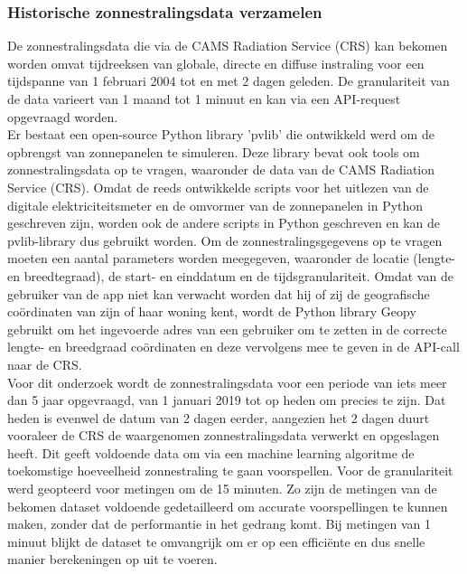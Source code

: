 \subsubsection{Historische zonnestralingsdata verzamelen}

De zonnestralingsdata die via de CAMS Radiation Service (CRS) kan bekomen worden omvat tijdreeksen van globale, directe en diffuse instraling voor een tijdspanne van 1 februari 2004 tot en met 2 dagen geleden. De granulariteit van de data varieert van 1 maand tot 1 minuut en kan via een API-request opgevraagd worden. \\

Er bestaat een open-source Python library 'pvlib' \autocite{Jensen2023} die ontwikkeld werd om de opbrengst van zonnepanelen te simuleren. Deze library bevat ook tools om zonnestralingsdata op te vragen, waaronder de data van de CAMS Radiation Service (CRS). Omdat de reeds ontwikkelde scripts voor het uitlezen van de digitale elektriciteitsmeter en de omvormer van de zonnepanelen in Python geschreven zijn, worden ook de andere scripts in Python geschreven en kan de pvlib-library dus gebruikt worden. Om de zonnestralingsgegevens op te vragen moeten een aantal parameters worden meegegeven, waaronder de locatie (lengte- en breedtegraad), de start- en einddatum en de tijdsgranulariteit. Omdat van de gebruiker van de app niet kan verwacht worden dat hij of zij de geografische coördinaten van zijn of haar woning kent, wordt de Python library Geopy gebruikt om het ingevoerde adres van een gebruiker om te zetten in de correcte lengte- en breedgraad  coördinaten en deze vervolgens mee te geven in de API-call naar de CRS. \\

Voor dit onderzoek wordt de zonnestralingsdata voor een periode van iets meer dan 5 jaar opgevraagd, van 1 januari 2019 tot op heden om precies te zijn. Dat heden is evenwel de datum van 2 dagen eerder, aangezien het 2 dagen duurt vooraleer de CRS de waargenomen zonnestralingsdata verwerkt en opgeslagen heeft. Dit geeft voldoende data om via een machine learning algoritme de toekomstige hoeveelheid zonnestraling te gaan voorspellen. Voor de granulariteit werd geopteerd voor metingen om de 15 minuten. Zo zijn de metingen van de bekomen dataset voldoende gedetailleerd om accurate voorspellingen te kunnen maken, zonder dat de performantie in het gedrang komt. Bij metingen van 1 minuut blijkt de dataset te omvangrijk om er op een efficiënte en dus snelle manier berekeningen op uit te voeren.

